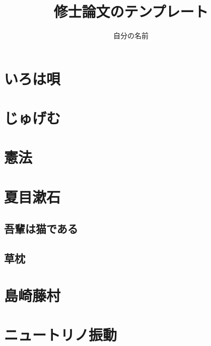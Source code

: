 \documentclass[report]{jlreq}
\title{修士論文のテンプレート}
\author{自分の名前}
\begin{document}
\maketitle

\tableofcontents

\chapter{いろは唄}


\chapter{じゅげむ}


\chapter{憲法}


\chapter{夏目漱石}

\section{吾輩は猫である}

\section{草枕}

\chapter{島崎藤村}


\chapter{ニュートリノ振動}
\end{document}
